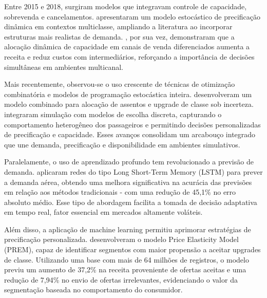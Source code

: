 Entre 2015 e 2018, surgiram modelos que integravam controle de capacidade, sobrevenda e cancelamentos. \citep{OTERO2015188} apresentaram um modelo estocástico de precificação dinâmica em contextos multiclasse, ampliando a literatura ao incorporar estruturas mais realistas de demanda. \citep{WANG2018173}, por sua vez, demonstraram que a alocação dinâmica de capacidade em canais de venda diferenciados aumenta a receita e reduz custos com intermediários, reforçando a importância de decisões simultâneas em ambientes multicanal.

Mais recentemente, observou-se o uso crescente de técnicas de otimização combinatória e modelos de programação estocástica inteira. \citep{LI2022100054} desenvolveram um modelo combinado para alocação de assentos e upgrade de classe sob incerteza. \citep{FUKUSHI2022297} integraram simulação com modelos de escolha discreta, capturando o comportamento heterogêneo dos passageiros e permitindo decisões personalizadas de precificação e capacidade. Esses avanços consolidam um arcabouço integrado que une demanda, precificação e disponibilidade em ambientes simulativos.

Paralelamente, o uso de aprendizado profundo tem revolucionado a previsão de demanda. \citep{HE2023109707} aplicaram redes do tipo Long Short-Term Memory (LSTM) para prever a demanda aérea, obtendo uma melhora significativa na acurácia das previsões em relação aos métodos tradicionais - com uma redução de 45,1\% no erro absoluto médio. Esse tipo de abordagem facilita a tomada de decisão adaptativa em tempo real, fator essencial em mercados altamente voláteis.

Além disso, a aplicação de machine learning permitiu aprimorar estratégias de precificação personalizada. \citep{THIRUMURUGANATHAN2023103759} desenvolveram o modelo Price Elasticity Model (PREM), capaz de identificar segmentos com maior propensão a aceitar upgrades de classe. Utilizando uma base com mais de 64 milhões de registros, o modelo previu um aumento de 37,2\% na receita proveniente de ofertas aceitas e uma redução de 7,94\% no envio de ofertas irrelevantes, evidenciando o valor da segmentação baseada no comportamento do consumidor.



